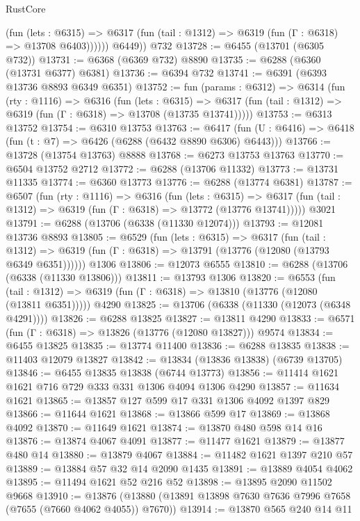 \begin{lexlean}{RustCore}
\begin{coremodule}
              (fun (lets : @6315) =>
              @6317 (fun (tail : @1312) => @6319 (fun (Γ : @6318) => @13708 @6403))))))
        @6449))
    @732
@13728 := @6455 (@13701 (@6305 @732))
@13731 := @6368 (@6369 @732) @8890
@13735 := @6288 (@6360 (@13731 @6377) @6381)
@13736 := @6394 @732
@13741 := @6391 (@6393 @13736 @8893 @6349 @6351)
@13752 := fun (params : @6312) =>
  @6314
    (fun (rty : @1116) =>
    @6316
      (fun (lets : @6315) =>
      @6317 (fun (tail : @1312) => @6319 (fun (Γ : @6318) => @13708 (@13735 @13741)))))
@13753 := @6313 @13752
@13754 := @6310 @13753
@13763 := @6417 (fun (U : @6416) => @6418 (fun (t : @7) => @6426 (@6288 (@6432 @8890 @6306) @6443)))
@13766 := @13728 (@13754 @13763) @8888
@13768 := @6273 @13753 @13763
@13770 := @6504 @13752 @2712
@13772 := @6288 (@13706 @11332)
@13773 := @13731 @11335
@13774 := @6360 @13773
@13776 := @6288 (@13774 @6381)
@13787 := @6507
    (fun (rty : @1116) =>
    @6316
      (fun (lets : @6315) =>
      @6317 (fun (tail : @1312) => @6319 (fun (Γ : @6318) => @13772 (@13776 @13741)))))
    @3021
@13791 := @6288 (@13706 (@6338 (@11330 @12074)))
@13793 := @12081 @13736 @8893
@13805 := @6529
    (fun (lets : @6315) =>
    @6317
      (fun (tail : @1312) =>
      @6319 (fun (Γ : @6318) => @13791 (@13776 (@12080 (@13793 @6349 @6351))))))
    @1306
@13806 := @12073 @6555
@13810 := @6288 (@13706 (@6338 (@11330 @13806)))
@13811 := @13793 @1306
@13820 := @6553
    (fun (tail : @1312) => @6319 (fun (Γ : @6318) => @13810 (@13776 (@12080 (@13811 @6351)))))
    @4290
@13825 := @13706 (@6338 (@11330 (@12073 (@6348 @4291))))
@13826 := @6288 @13825
@13827 := @13811 @4290
@13833 := @6571 (fun (Γ : @6318) => @13826 (@13776 (@12080 @13827))) @9574
@13834 := @6455 @13825
@13835 := @13774 @11400
@13836 := @6288 @13835
@13838 := @11403 @12079 @13827
@13842 := @13834 (@13836 @13838) (@6739 @13705)
@13846 := @6455 @13835 @13838 (@6744 @13773)
@13856 := @11414 @1621 @1621 @716 @729 @333 @331 @1306 @4094 @1306 @4290
@13857 := @11634 @1621
@13865 := @13857 @127 @599 @17 @331 @1306 @4092 @1397 @829
@13866 := @11644 @1621
@13868 := @13866 @599 @17
@13869 := @13868 @4092
@13870 := @11649 @1621
@13874 := @13870 @480 @598 @14 @16
@13876 := @13874 @4067 @4091
@13877 := @11477 @1621
@13879 := @13877 @480 @14
@13880 := @13879 @4067
@13884 := @11482 @1621 @1397 @210 @57
@13889 := @13884 @57 @32 @14 @2090 @1435
@13891 := @13889 @4054 @4062
@13895 := @11494 @1621 @52 @216 @52
@13898 := @13895 @2090 @11502 @9668
@13910 := @13876 (@13880 (@13891 @13898 @7630 @7636 @7996 @7658 (@7655 (@7660 @4062 @4055)) @7670))
@13914 := @13870 @565 @240 @14 @11

\end{coremodule}
\end{lexlean}
